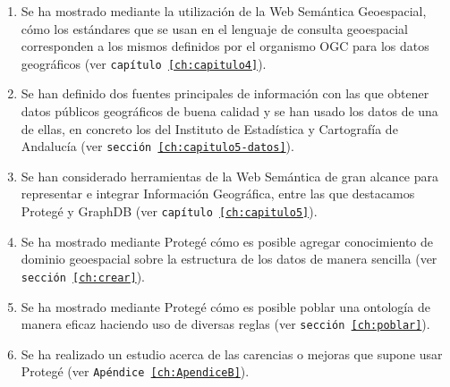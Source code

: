 \begin{enumerate}
	
	\item Se ha mostrado mediante la utilización de la Web Semántica Geoespacial, cómo los estándares que se usan en el lenguaje de consulta geoespacial corresponden a los mismos definidos por el organismo OGC para los datos geográficos (ver \texttt{capítulo \ref{ch:capitulo4}}).
	
	\item Se han definido dos fuentes principales de información con las que obtener datos públicos geográficos de buena calidad y se han usado los datos de una de ellas, en concreto los del Instituto de Estadística y Cartografía de Andalucía (ver \texttt{sección \ref{ch:capitulo5-datos}}).
	
	
	\item Se han considerado herramientas de la Web Semántica de gran alcance para representar e integrar Información Geográfica, entre las que destacamos Protegé y GraphDB (ver \texttt{capítulo \ref{ch:capitulo5}}).
	
	\item Se ha mostrado mediante Protegé cómo es posible agregar conocimiento de dominio geoespacial sobre la estructura de los datos de manera sencilla (ver \texttt{sección \ref{ch:crear}}).
	
	\item Se ha mostrado mediante Protegé cómo es posible poblar una ontología de manera eficaz haciendo uso de diversas reglas (ver \texttt{sección \ref{ch:poblar}}).
	
	\item Se ha realizado un estudio acerca de las carencias o mejoras que supone usar Protegé (ver \texttt{Apéndice \ref{ch:ApendiceB}}).
	

\end{enumerate}

